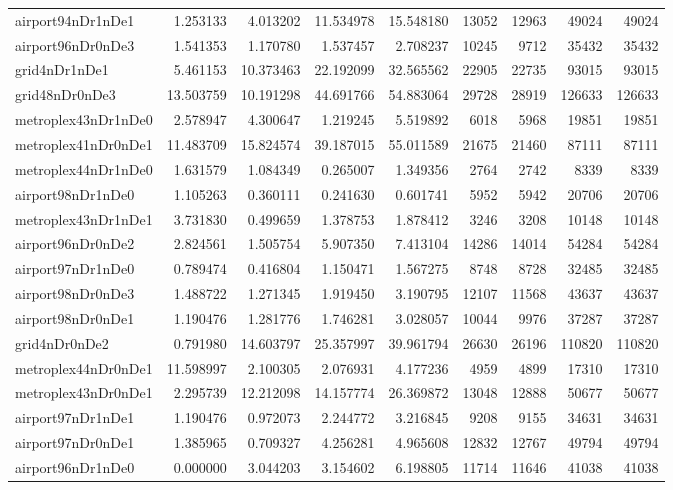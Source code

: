 \begin{longtable}{|l|r|r|r|r|r|r|r|r|}
airport94nDr1nDe1 & 1.253133 & 4.013202 & 11.534978 & 15.548180 & 13052 & 12963 & 49024 & 49024 \\
airport96nDr0nDe3 & 1.541353 & 1.170780 & 1.537457 & 2.708237 & 10245 & 9712 & 35432 & 35432 \\
grid4nDr1nDe1 & 5.461153 & 10.373463 & 22.192099 & 32.565562 & 22905 & 22735 & 93015 & 93015 \\
grid48nDr0nDe3 & 13.503759 & 10.191298 & 44.691766 & 54.883064 & 29728 & 28919 & 126633 & 126633 \\
metroplex43nDr1nDe0 & 2.578947 & 4.300647 & 1.219245 & 5.519892 & 6018 & 5968 & 19851 & 19851 \\
metroplex41nDr0nDe1 & 11.483709 & 15.824574 & 39.187015 & 55.011589 & 21675 & 21460 & 87111 & 87111 \\
metroplex44nDr1nDe0 & 1.631579 & 1.084349 & 0.265007 & 1.349356 & 2764 & 2742 & 8339 & 8339 \\
airport98nDr1nDe0 & 1.105263 & 0.360111 & 0.241630 & 0.601741 & 5952 & 5942 & 20706 & 20706 \\
metroplex43nDr1nDe1 & 3.731830 & 0.499659 & 1.378753 & 1.878412 & 3246 & 3208 & 10148 & 10148 \\
airport96nDr0nDe2 & 2.824561 & 1.505754 & 5.907350 & 7.413104 & 14286 & 14014 & 54284 & 54284 \\
airport97nDr1nDe0 & 0.789474 & 0.416804 & 1.150471 & 1.567275 & 8748 & 8728 & 32485 & 32485 \\
airport98nDr0nDe3 & 1.488722 & 1.271345 & 1.919450 & 3.190795 & 12107 & 11568 & 43637 & 43637 \\
airport98nDr0nDe1 & 1.190476 & 1.281776 & 1.746281 & 3.028057 & 10044 & 9976 & 37287 & 37287 \\
grid4nDr0nDe2 & 0.791980 & 14.603797 & 25.357997 & 39.961794 & 26630 & 26196 & 110820 & 110820 \\
metroplex44nDr0nDe1 & 11.598997 & 2.100305 & 2.076931 & 4.177236 & 4959 & 4899 & 17310 & 17310 \\
metroplex43nDr0nDe1 & 2.295739 & 12.212098 & 14.157774 & 26.369872 & 13048 & 12888 & 50677 & 50677 \\
airport97nDr1nDe1 & 1.190476 & 0.972073 & 2.244772 & 3.216845 & 9208 & 9155 & 34631 & 34631 \\
airport97nDr0nDe1 & 1.385965 & 0.709327 & 4.256281 & 4.965608 & 12832 & 12767 & 49794 & 49794 \\
airport96nDr1nDe0 & 0.000000 & 3.044203 & 3.154602 & 6.198805 & 11714 & 11646 & 41038 & 41038 \\

\end{longtable}
